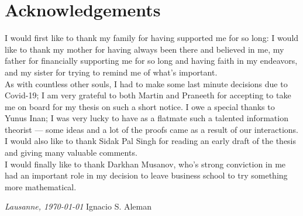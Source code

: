 \chapter*{Acknowledgements}
\vspace{0.2\textheight}

I would first like to thank my family for having supported me for so long:
I would like to thank my mother for having always been there and believed in me, 
my father for financially supporting me for so long and having faith in my endeavors, 
and my sister for trying to remind me of what's important.\\


As with countless other souls, I had to make some last minute decisions 
due to Covid-19; I am very grateful to both Martin and Praneeth for 
accepting to take me on board for my thesis on such a short notice. 
I owe a special thanks to Yunus Inan; I was very lucky to have as a 
flatmate such a talented information theorist --- some ideas and a lot 
of the proofs came as a result of our interactions. 
I would also like to thank Sidak Pal Singh for reading an early draft of the thesis 
and giving many valuable comments. \\

I would finally like to thank Darkhan Musanov, who's strong conviction in me 
had an important role in my decision to leave business school to try something 
more mathematical. 

\bigskip
 
\noindent\textit{Lausanne, \today}
\hfill Ignacio S. Aleman
